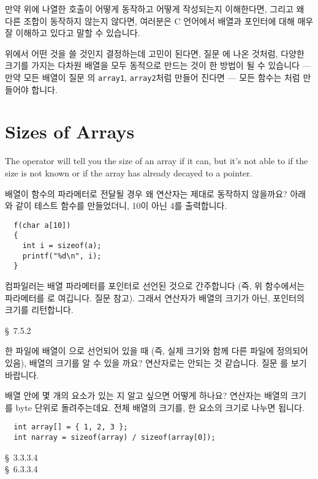 \begin{faq}
	만약 위에 나열한 호출이 어떻게 동작하고 어떻게 작성되는지
	이해한다면, 그리고 왜 다른 조합이 동작하지 않는지 않다면,
	여러분은 C 언어에서 배열과 포인터에 대해 매우 잘 이해하고 있다고
	말할 수 있습니다.

	위에서 어떤 것을 쓸 것인지 결정하는데 고민이 된다면, 질문 에
	나온 것처럼, 다양한 크기를 가지는 다차원 배열을 모두 동적으로 만드는
	것이 한 방법이 될 수 있습니다 --- 만약 모든 배열이 질문 의
	\verb+array1+, \verb+array2+처럼 만들어 진다면 --- 모든 함수는
	처럼 만들어야 합니다.
\end{faq}

\section{Sizes of Arrays}
The  operator will tell you the size of an array if it can, but
it's not able to if the size is not known or if the array has already decayed
to a pointer.

\begin{faq}
	배열이 함수의 파라메터로 전달될 경우 왜  연산자는
	제대로 동작하지 않을까요? 아래와 같이 테스트 함수를 만들었더니,
	10이 아닌 4를 출력합니다.
\begin{verbatim}
  f(char a[10])
  {
    int i = sizeof(a);
    printf("%d\n", i);
  }
\end{verbatim}

\A
	컴파일러는 배열 파라메터를 포인터로 선언된 것으로 간주합니다
	(즉, 위 함수에서는 파라메터를 로 여깁니다.
	질문  참고).  그래서  연산자가
	배열의 크기가 아닌, 포인터의 크기를 리턴합니다.
	
\R
	\cite{hs} \S\ 7.5.2 
\end{faq}

\begin{faq}
	한 파일에 배열이 으로 선언되어 있을 때 (즉, 실제 크기와 함께
	다른 파일에 정의되어 있음), 배열의 크기를 알 수 있을 까요?
	 연산자로는 안되는 것 같습니다.
\A
	질문 를 보기 바랍니다.
\end{faq}

\begin{faq}
	배열 안에 몇 개의 요소가 있는 지 알고 싶으면 어떻게 하나요? 
	연산자는 배열의 크기를 byte 단위로 돌려주는데요.
\A
	전체 배열의 크기를, 한 요소의 크기로 나누면 됩니다.
\begin{verbatim}
  int array[] = { 1, 2, 3 };
  int narray = sizeof(array) / sizeof(array[0]);
\end{verbatim}
\R
	\cite{ansi} \S\ 3.3.3.4 \\
	\cite{c89} \S\ 6.3.3.4
\end{faq}

%
%
